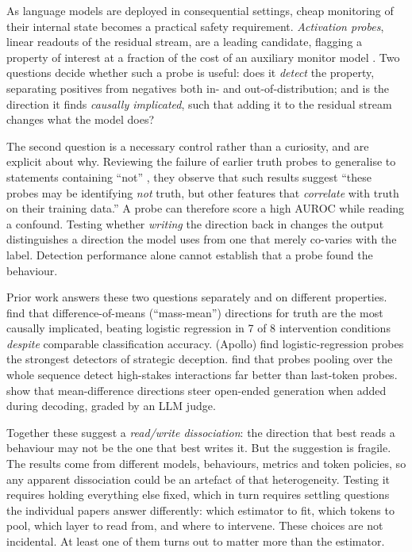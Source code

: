\documentclass[conference]{IEEEtran}
\begin{document}
As language models are deployed in consequential settings, cheap monitoring of
their internal state becomes a practical safety requirement. \emph{Activation
probes}, linear readouts of the residual stream, are a leading candidate,
flagging a property of interest at a fraction of the cost of an auxiliary monitor
model \citep{alain2018,mckenzie2025}. Two questions decide whether such a probe is
useful: does it \emph{detect} the property, separating positives from negatives
both in- and out-of-distribution; and is the direction it finds
\emph{causally implicated}, such that adding it to the residual stream changes
what the model does?

The second question is a necessary control rather than a curiosity, and
\citet{marks2024} are explicit about why. Reviewing the failure of earlier truth
probes to generalise to statements containing ``not'' \citep{levinstein2024}, they
observe that such results suggest ``these probes may be identifying \emph{not}
truth, but other features that \emph{correlate} with truth on their training
data.'' A probe can therefore score a high AUROC while reading a confound.
Testing whether \emph{writing} the direction back in changes the output
distinguishes a direction the model uses from one that merely co-varies with the
label. Detection performance alone cannot establish that a probe found the
behaviour.

Prior work answers these two questions separately and on different properties.
\citet{marks2024} find that difference-of-means (``mass-mean'') directions for
truth are the most causally implicated, beating logistic regression in 7 of 8
intervention conditions \emph{despite} comparable classification accuracy.
\citet{goldowsky2025} (Apollo) find logistic-regression probes the strongest
detectors of strategic deception. \citet{mckenzie2025} find that probes pooling
over the whole sequence detect high-stakes interactions far better than
last-token probes. \citet{rimsky2024} show that mean-difference directions steer
open-ended generation when added during decoding, graded by an LLM judge.

Together these suggest a \emph{read/write dissociation}: the direction that best
reads a behaviour may not be the one that best writes it. But the suggestion is
fragile. The results come from different models, behaviours, metrics and token
policies, so any apparent dissociation could be an artefact of that heterogeneity.
Testing it requires holding everything else fixed, which in turn requires settling
questions the individual papers answer differently: which estimator to fit, which
tokens to pool, which layer to read from, and where to intervene. These choices are
not incidental. At least one of them turns out to matter more than the estimator.
\end{document}
